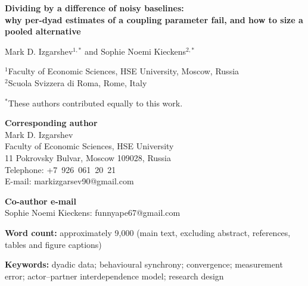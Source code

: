 \documentclass[12pt]{article}
\begin{document}
\thispagestyle{fancy}
\begin{center}
\vspace*{0.5in}
{\large\bfseries Dividing by a difference of noisy baselines:\\
why per-dyad estimates of a coupling parameter fail, and how to size a pooled alternative}

\vspace{0.5in}

Mark D. Izgarshev$^{1,*}$ and Sophie Noemi Kieckens$^{2,*}$

\vspace{0.25in}

$^{1}$Faculty of Economic Sciences, HSE University, Moscow, Russia\\
$^{2}$Scuola Svizzera di Roma, Rome, Italy

\vspace{0.15in}

$^{*}$These authors contributed equally to this work.

\vspace{0.75in}
\end{center}

\noindent\textbf{Corresponding author}\\
\mbox{}Mark D. Izgarshev\\
\mbox{}Faculty of Economic Sciences, HSE University\\
\mbox{}11 Pokrovsky Bulvar, Moscow 109028, Russia\\
Telephone: \mbox{+7 926 061 20 21}\\
E-mail: \mbox{markizgarsev90@gmail.com}

\vspace{0.15in}

\noindent\textbf{Co-author e-mail}\\
\mbox{}Sophie Noemi Kieckens: \mbox{funnyape67@gmail.com}

\vspace{0.25in}

\noindent\textbf{Word count:} approximately 9{,}000 (main text, excluding
abstract, references, tables and figure captions)

\vspace{0.25in}

\noindent\textbf{Keywords:} dyadic data; behavioural synchrony; convergence;
measurement error; actor--partner interdependence model; research design

\newpage
\end{document}
